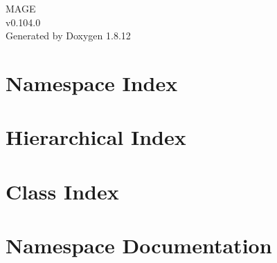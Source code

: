 \documentclass[twoside]{book}
\newcommand{\+}{\discretionary{\mbox{\scriptsize$\hookleftarrow$}}{}{}}
\newcommand{\clearemptydoublepage}{%
  \newpage{\pagestyle{empty}\cleardoublepage}%
}
\begin{document}
\hypersetup{pageanchor=false,
             bookmarksnumbered=true,
             pdfencoding=unicode
            }
\begin{titlepage}
\vspace*{7cm}
\begin{center}%
{\Large M\+A\+GE \\[1ex]\large v0.\+104.\+0 }\\
\vspace*{1cm}
{\large Generated by Doxygen 1.8.12}\\
\end{center}
\end{titlepage}
\clearemptydoublepage
{}
\tableofcontents
\clearemptydoublepage
{}
\hypersetup{pageanchor=true}

\chapter{Namespace Index}

\chapter{Hierarchical Index}

\chapter{Class Index}

\chapter{Namespace Documentation}


\end{document}
